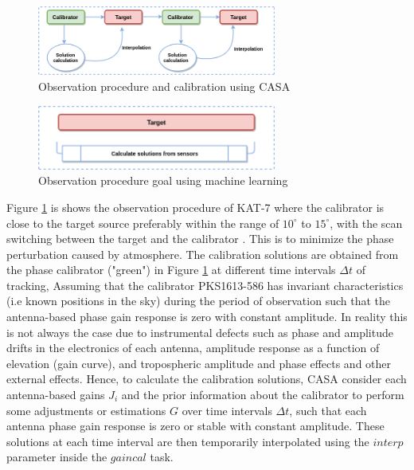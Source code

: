 \begin{figure}[H]
  \centering
    \includegraphics[width=0.7\textwidth]{images/cal4.png}
    \caption{Observation procedure and calibration using CASA}
  \label{Cal2}
\end{figure}

\begin{figure}[H]
  \centering
    \includegraphics[width=0.7\textwidth]{images/Cal3.png}
    \caption{Observation procedure goal using machine learning}
  \label{Cal3}
\end{figure}

Figure \ref{Cal2} is shows the observation procedure of KAT-7 where the calibrator is close to the target source preferably within the range of $10^{\circ}$ to $15^{\circ}$, with the scan switching  between  the target and the calibrator \citep{kassaye2015study}. This is to minimize the phase perturbation caused by atmosphere. The calibration solutions are obtained from the phase calibrator ("green") in Figure \ref{Cal2} at different time intervals $\Delta t$ of tracking, Assuming that the calibrator PKS1613-586 has invariant characteristics (i.e known positions in the sky) during the period of observation such that the 
antenna-based  phase  gain response is zero with constant amplitude. In reality this is not always the case due to instrumental defects such as phase and amplitude drifts in the electronics of each antenna, amplitude response as a function of elevation (gain curve), and tropospheric amplitude and phase effects and other external effects. Hence, to calculate the calibration solutions, CASA consider each antenna-based gains $J_i$ and the prior information about the calibrator to perform some adjustments or estimations $G$ over time intervals $\Delta t$, such that each antenna phase gain response is zero or stable with constant amplitude. These solutions at each time interval are then temporarily interpolated using the $\textit{interp}$ parameter inside the $\textit{gaincal}$ task. 


